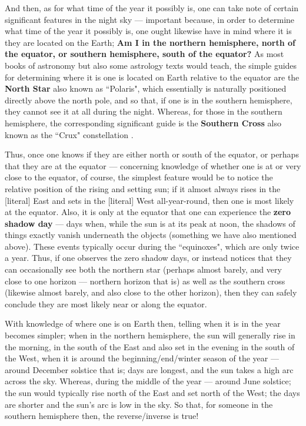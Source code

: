 \documentclass[a4paper]{article}
\begin{document}
And then, as for what time of the year it possibly is, one can take note of certain significant features in the night sky --- important because, in order to determine what time of the year it possibly is, one ought likewise have in mind where it is they are located on the Earth; \textbf{Am I in the northern hemisphere, north of the equator, or southern hemisphere, south of the equator?} As most books of astronomy but also some astrology texts would teach, the simple guides for determining where it is one is located on Earth relative to the equator are the \textbf{North Star} also known as ``Polaris", which essentially is naturally positioned directly above the north pole, and so that, if one is in the southern hemisphere, they cannot see it at all during the night. Whereas, for those in the southern hemisphere, the corresponding significant guide is the \textbf{Southern Cross} also known as the ``Crux" constellation \cite{copilot_assistant}. 

Thus, once one knows if they are either north or south of the equator, or perhaps that they are at the equator --- concerning knowledge of whether one is at or very close to the equator, of course, the simplest feature would be to notice the relative position of the rising and setting sun; if it almost always rises in the [literal] East and sets in the [literal] West all-year-round, then one is most likely at the equator. Also, it is only at the equator that one can experience the \textbf{zero shadow day} --- days when, while the sun is at its peak at noon, the shadows of things exactly vanish underneath the objects (something we have also mentioned above). These events typically occur during the ``equinoxes", which are only twice a year. Thus, if one observes the zero shadow days, or instead notices that they can occasionally see both the northern star (perhaps almost barely, and very close to one horizon --- northern horizon that is) as well as the southern cross (likewise almost barely, and also close to the other horizon), then they can safely conclude they are most likely near or along the equator.

With knowledge of where one is on Earth then, telling when it is in the year becomes simpler; when in the northern hemisphere, the sun will generally rise in the morning, in the south of the East and also set in the evening in the south of the West, when it is around the beginning/end/winter season of the year --- around December solstice that is; days are longest, and the sun takes a high arc across the sky\cite{copilot_assistant}. Whereas, during the middle of the year --- around June solstice; the sun would typically rise north of the East and set north of the West; the days are shorter and the sun's arc is low in the sky. So that, for someone in the southern hemisphere then, the reverse/inverse is true! 
\end{document}
